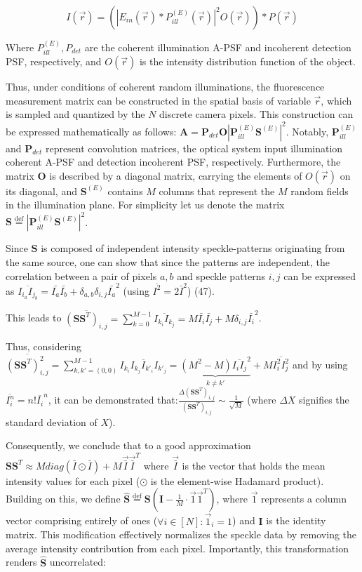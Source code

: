 \documentclass[pdflatex,sn-mathphys-num,Numbered]{sn-jnl}%
\theoremstyle{thmstyleone}%
\theoremstyle{thmstyletwo}%
\theoremstyle{thmstylethree}%
\begin{document}
\begin{equation}
{I}(\vec{r}) = (|{E}_{in}(\vec{r})*{P}^{(E)}_{ill}(\vec{r})|^2{O}(\vec{r}))*{P}(\vec{r})
\label{eq:1}
\tag{S1}
\end{equation}

Where ${P}^{(E)}_{ill}, {P}_{det}$ are the coherent illumination A-PSF and incoherent detection PSF, respectively, and ${O}(\vec{r})$ is the intensity distribution function of the object.

Thus, under conditions of coherent random illuminations, the fluorescence measurement matrix can be constructed in the spatial basis of variable $\vec{r}$, which is sampled and quantized by the $N$ discrete camera pixels. This construction can be expressed mathematically as follows: ${\textbf{A}} = \textbf{P}_{det}\textbf{O}|\textbf{P}^{(E)}_{ill}\textbf{S}^{(E)}|^2$.
Notably, $\textbf{P}^{(E)}_{ill}$ and $\textbf{P}_{det}$ represent convolution matrices, the optical system input illumination coherent A-PSF and detection incoherent PSF, respectively. Furthermore, the matrix ${\textbf{O}}$ is described by a diagonal matrix, carrying the elements of ${O}(\vec{r})$ on its diagonal, and $\textbf{S}^{(E)}$ contains $M$ columns that represent the $M$ random fields in the illumination plane. For simplicity let us denote the matrix  $\textbf{S} \stackrel{\text{def}} = |\textbf{P}^{(E)}_{ill}\textbf{S}^{(E)}|^2$.

Since $\textbf{S}$ is composed of independent intensity speckle-patterns originating from the same source, one can show that since the patterns are independent, the correlation between a pair of pixels ${a,b}$ and speckle patterns ${i,j}$ can be expressed as $\overline{I_{i_a}I_{j_b}}=\bar{I_a}\bar{I_b}+\delta_{a,b}\delta_{i,j}\bar{I_a}^2$ (using $\overline{I^2}=2\bar{I}^2$) (47).

\noindent This leads to $\overline{(\textbf{S}\textbf{S}^{T})_{i,j}} = \sum^{M-1}_{k=0}\overline{I_{k_i}I_{k_j}} = M\bar{I_i}\bar{I_j}+M\delta_{i,j}\bar{I_i}^2$.

\noindent Thus, considering $\overline{(\textbf{S}\textbf{S}^{T})^2_{i,j}}=\sum^{M-1}_{k,k'=(0,0)}\overline{I_{k_i}I_{k_j}I_{k'_i}I_{k'_j}} = \underbrace{(M^2-M)\overline{I_{i}I_{j}}^2}_{k\neq k'}+M\overline{I^2_{i}I^2_{j}}$ 
and by using $\overline{I^n_i}=n!\overline{I_i}^n$,  it can be demonstrated that:$\frac{\Delta(\textbf{S}\textbf{S}^{T})_{i,j}}{(\textbf{S}\textbf{S}^{T})_{i,j}} \sim \frac{1}{\sqrt{M}}$
(where $\Delta X$ signifies the standard deviation of $X$). 

Consequently, we conclude that to a good approximation $\textbf{S}\textbf{S}^{T} \approx Mdiag(\bar{I}\odot \bar{I}) + M\vec{\bar{I}}\vec{\bar{I}}^T$ where $\vec{\bar{I}}$ is the vector that holds the mean intensity values for each pixel ($\odot$ is the element-wise Hadamard product).
Building on this, we define $\hat{\textbf{S}}\stackrel{\text{def}} = \textbf{S} (\mathbf{I}-\frac{1}{M}\cdot\vec{1}\vec{1}^T)$, where $\vec{1}$ represents a column vector comprising entirely of ones ($\forall i\in[N] :
\vec{1}_{i}=1$) and $\mathbf{I}$ is the identity matrix. This modification effectively normalizes the speckle data by removing the average intensity contribution from each pixel.
Importantly, this transformation renders $\hat{\textbf{S}}$ uncorrelated:
\end{document}
